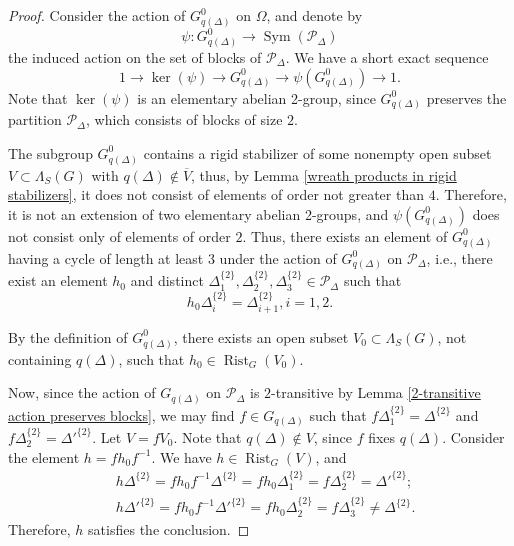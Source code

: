 \documentclass[11pt,letterpaper]{article}
\DeclareMathOperator{\rist}{Rist}
\DeclareMathOperator{\Sym}{Sym}
\theoremstyle{definition}
\theoremstyle{remark}
\begin{document}
\begin{proof}
Consider the action of $G_{q(\Delta)}^0$ on $\Omega$, and denote by 
$$
\psi \colon G_{q(\Delta)}^0 \longrightarrow \Sym(\mathcal{P}_{\Delta})
$$
the induced action on the set of blocks of $\mathcal{P}_{\Delta}$.
We have a short exact sequence 
$$
1 \longrightarrow \ker(\psi) \longrightarrow G_{q(\Delta)}^0 \longrightarrow \psi(G_{q(\Delta)}^0) \longrightarrow 1.
$$
Note that $\ker(\psi)$ is an elementary abelian 2-group, since $G_{q(\Delta)}^0$ preserves the partition $\mathcal{P}_{\Delta}$, which consists of blocks of size $2$.

 The subgroup $G_{q(\Delta)}^0$ contains a rigid stabilizer of some nonempty open subset $V \subset \Lambda_S(G)$ with $q(\Delta) \notin \overline{V}$, thus, by Lemma \ref{wreath products in rigid stabilizers}, it does not consist of elements of order not greater than $4$. Therefore, it is not an extension of two elementary abelian 2-groups, and  $\psi(G_{q(\Delta)}^0)$ does not consist only of elements of order $2$. Thus, there exists an element of $G_{q(\Delta)}^0$ having a cycle of length at least $3$ under the action of $G_{q(\Delta)}^0$ on $\mathcal{P}_{\Delta}$, i.e., there exist an element $h_0$ and distinct $\Delta_1^{\{2\}}, \Delta_2^{\{2\}}, \Delta_3^{\{2\}} \in \mathcal{P}_{\Delta}$ such that $$
h_0\Delta_i^{\{2\}}=\Delta_{i+1}^{\{2\}}, i=1,2.
$$ 

By the definition of $G_{q(\Delta)}^0$, there exists an open subset $V_0 \subset \Lambda_S(G)$, not containing $q(\Delta)$, such that $h_0 \in \rist_G(V_0)$. 

Now, since the action of $G_{q(\Delta)}$ on $\mathcal{P}_{\Delta}$ is $2$-transitive by Lemma \ref{2-transitive action preserves blocks}, we may find $f \in G_{q(\Delta)}$ such that $f\Delta_1^{\{2\}}=\Delta^{\{2\}}$ and $f\Delta_2^{\{2\}}=\Delta'^{\{2\}}$.
Let $V=fV_0$. Note that $ q(\Delta) \notin V$, since $f$ fixes $q(\Delta)$.
Consider the element $h=f h_0 f^{-1}$. We have $h \in \rist_G(V)$, and 
$$
\begin{aligned}
&h\Delta^{\{2\}}= fh_0f^{-1}\Delta^{\{2\}}=fh_0\Delta_1^{\{2\}}=f\Delta_2^{\{2\}}=\Delta'^{\{2\}};\\
&h\Delta'^{\{2\}}= fh_0f^{-1}\Delta'^{\{2\}}=fh_0\Delta_2^{\{2\}}=f\Delta_3^{\{2\}} \neq \Delta^{\{2\}}.
\end{aligned}
$$
Therefore, $h$ satisfies the conclusion.
\end{proof}
\end{document}
